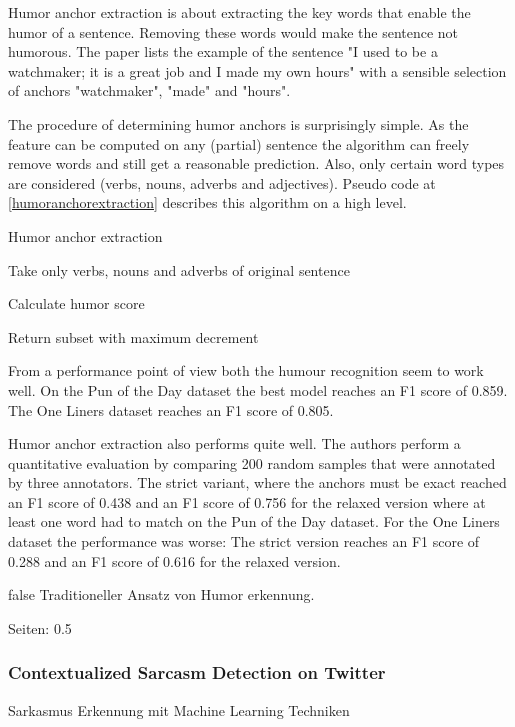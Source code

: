 \documentclass[draft,final,oneside]{vutinfth} %
\begin{document}
Humor anchor extraction is about extracting the key words that enable the humor of a sentence. Removing these words would make the sentence not humorous. The paper lists the example of the sentence "I used to be a watchmaker; it is a great job and I made my own hours" with a sensible selection of anchors "watchmaker", "made" and "hours".

The procedure of determining humor anchors is surprisingly simple. As the feature can be computed on any (partial) sentence the algorithm can freely remove words and still get a reasonable prediction. Also, only certain word types are considered (verbs, nouns, adverbs and adjectives). Pseudo code at \ref{humoranchorextraction} describes this algorithm on a high level.

\begin{algorithm}
\caption{Humor anchor extraction}\label{humoranchorextraction}

Take only verbs, nouns and adverbs of original sentence

Calculate humor score


Return subset with maximum decrement

\end{algorithm}

From a performance point of view both the humour recognition seem to work well. On the Pun of the Day dataset the best model reaches an F1 score of 0.859. The One Liners dataset reaches an F1 score of 0.805.

Humor anchor extraction also performs quite well. The authors perform a quantitative evaluation by comparing 200 random samples that were annotated by three annotators. The strict variant, where the anchors must be exact reached an F1 score of 0.438 and an F1 score of 0.756 for the relaxed version where at least one word had to match on the Pun of the Day dataset. For the One Liners dataset the performance was worse: The strict version reaches an F1 score of 0.288 and an F1 score of 0.616 for the relaxed version.

\if false
Traditioneller Ansatz von Humor erkennung.

\cite{Yang2015HumorRA}

Seiten: 0.5


\subsubsection{Contextualized Sarcasm Detection on Twitter}
Sarkasmus Erkennung mit Machine Learning Techniken
\end{document}
